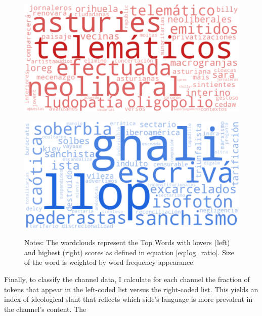 \documentclass[12pt]{article}
\begin{document}
	
	
	
	
	\begin{figure}[H]
		\centering
		\begin{minipage}{0.46\textwidth}
						\label{fig:wordcloud1}
			\centering
			\includegraphics[width=\linewidth]{figures/congress_left.pdf}

		\end{minipage}
		\hspace{0.04\textwidth}
		\begin{minipage}{0.46\textwidth}
						\label{fig:worcloud2}
			\centering
			\includegraphics[width=\linewidth]{figures/congress_right.pdf}


		\end{minipage}
		\caption*{\small Notes: The wordclouds represent the Top Words with lowers (left) and highest (right) scores as defined in equation \ref{eq:log_ratio}. Size of the word is weighted by word frequency appearance.  }
	\end{figure}
	
	
	
	
	
	Finally, to classify the channel data, I calculate for each channel the fraction of tokens that appear in the left-coded list versus the right-coded list. This yields an index of ideological slant that reflects which side's language is more prevalent in the channel’s content. The 
	
\end{document}
